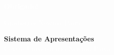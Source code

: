 \documentclass[aspectratio=169]{beamer}
\begin{document}
\begin{frame}
    \begin{center}
        \vfill
        \Huge{\textcolor{white}{\textbf{Obrigado!}}}
        \vspace{1cm}
        
        \newtonlogo[3cm]
        
        \vspace{1cm}
        \Large{\textcolor{white}{Gradientes Newton Paiva}}
        
        \vspace{1.5cm}
        \textcolor{newtanorange}{\textbf{Sistema de Apresentações}}
        \\[0.3cm]
        \textcolor{white}{Centro Universitário Newton Paiva}
        \vfill
    \end{center}
\end{frame}
\end{document}
